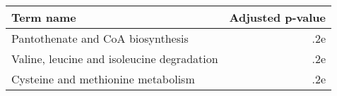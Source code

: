 \begin{tabular}{lr}
\toprule
                                 Term name &  Adjusted p-value \\
\midrule
         Pantothenate and CoA biosynthesis &               .2e \\
Valine, leucine and isoleucine degradation &               .2e \\
        Cysteine and methionine metabolism &               .2e \\
\bottomrule
\end{tabular}
